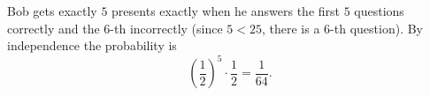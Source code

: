 Bob gets exactly $5$ presents exactly when he answers the first $5$ questions correctly and the $6$-th incorrectly (since $5<25$, there is a $6$-th question). By independence the probability is
\[\left(\dfrac12\right)^5\cdot\dfrac12=\boxed{\dfrac{1}{64}}.\]
